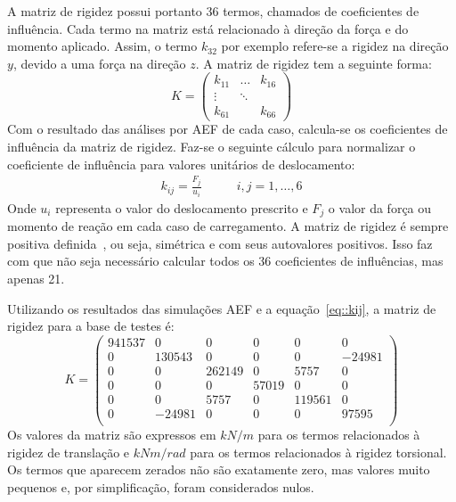 A matriz de rigidez possui portanto 36 termos, chamados de coeficientes de
influência. Cada termo na matriz está relacionado à direção da força e do
momento aplicado. Assim, o termo $k_{32}$ por exemplo refere-se a rigidez na
direção $y$, devido a uma força na direção $z$. A matriz de rigidez tem a
seguinte forma:
%
\begin{equation}
K = \begin{pmatrix} 
    k_{11} & \dots 	& k_{16} \\
    \vdots & \ddots & \\
    k_{61} &        & k_{66} 
    \end{pmatrix}
\end{equation}
%
Com o resultado das análises por AEF de cada caso, calcula-se os coeficientes de
influência da matriz de rigidez. Faz-se o
seguinte cálculo para normalizar o coeficiente de influência para valores
unitários de deslocamento:
%
\begin{align} \label{eq::kij}
	k_{ij} = \frac{F_j}{u_{i}} \qquad &  i,j = 1,\ldots,6
\end{align}
%
Onde $u_i$ representa o valor do deslocamento prescrito e $F_j$ o valor da força
ou momento de reação em cada caso de carregamento.
A matriz de rigidez é sempre positiva
definida~\cite{adhikari2004rayleigh}, ou seja, simétrica e com
seus autovalores positivos.
Isso faz com que não seja necessário calcular todos os 36 coeficientes de influências, mas apenas 21. 

Utilizando os resultados das simulações AEF e a equação~\ref{eq::kij}, a matriz
de rigidez para a base de testes é:
%
\begin{equation*}
	K =
\begin{pmatrix}
941537	&	0	&	0	&	0	&	0	&	0 \\
0	&	130543	&	0	&	0	&	0	&	-24981 \\
0	&	0	&	262149	&	0	&	5757	&	0 \\
0	&	0	&	0	&	57019	&	0	&	0 \\
0	&	0	&	5757	&	0	&	119561	&	0 \\
0	&	-24981	&	0	&	0	&	0	&	97595 \\
\end{pmatrix}
\end{equation*}
%
Os valores da matriz são expressos em $kN/m$ para os termos relacionados à
rigidez de translação e $kNm/rad$ para os termos relacionados à rigidez
torsional.
Os termos que aparecem zerados não são exatamente zero, mas valores muito
pequenos e, por simplificação, foram considerados nulos.



